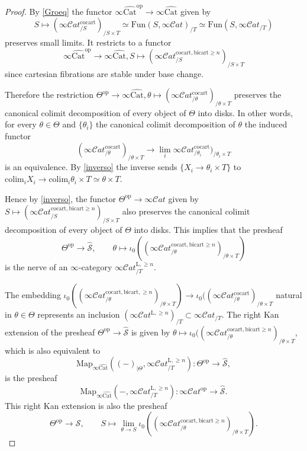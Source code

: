 \documentclass[10pt,oneside]{article}
\numberwithin{equation}{section} %
\numberwithin{figure}{section} %
\theoremstyle{plain}
\theoremstyle{definition}
\newcommand{\mS}{{\mathcal S}}
\newcommand{\op}{\mathrm{op}}
\newcommand{\colim}{\mathrm{colim}}
\newcommand{\Cat}{\mathrm{Cat}}
\newcommand{\Fun}{\mathrm{Fun}}
\newcommand{\cocart}{{\mathrm{cocart}}}
\newcommand{\bicart}{{\mathrm{bicart}}}
\newcommand{\Map}{{\mathrm{Map}}}
\newcommand{\scat}{\mathcal{C}\mathit{at}}
\begin{document}
\begin{proof}
By \cref{Groeq} the functor $ \infty\widehat{\Cat}^\op \to \infty\widehat{\Cat}$ given by $$ S \mapsto (\infty\scat^{\cocart}_{/S})_{/ S \times T} \simeq \Fun(S, \infty\scat)_{/T} \simeq \Fun(S, \infty\scat_{/T}) $$ preserves small limits.
It restricts to a functor $$ \infty\widehat{\Cat}^\op \to \infty\widehat{\Cat}, S \mapsto (\infty\scat^{\cocart, \bicart\geq n}_{/S})_{/ S \times T} $$ since cartesian fibrations are stable under base change.

Therefore the restriction $\Theta^\op \to \infty\widehat{\Cat}, \theta \mapsto (\infty\scat^{\cocart}_{/\theta})_{/ \theta \times T} $ preserves the canonical colimit decomposition of every object of $\Theta$ into disks.
In other words, for every $\theta \in \Theta$ and $\{\theta_i\}$ the canonical colimit decomposition of $\theta$ the induced functor
$$ (\infty\scat^{\cocart}_{/\theta})_{/ \theta \times T} \to \lim_i \infty\scat^{\cocart}_{/\theta_i})_{/ \theta_i \times T} $$
is an equivalence. By \cref{inverso} the inverse sends $\{X_i \to \theta_i \times T\}$
to $\colim_i X_i \to \colim_i \theta_i \times T \simeq \theta \times T.$

Hence by \cref{inverso}, the functor $\Theta^\op \to \infty\scat$ given by $S \mapsto (\infty\scat^{\cocart, \bicart\geq n}_{/S})_{/ S \times T} $ also preserves the canonical colimit decomposition of every object of $\Theta$ into disks.
This implies that the presheaf $$ \Theta^\op \to \widehat{\mS},\qquad \theta \mapsto \iota_0((\infty\scat^{\cocart, \bicart\geq n}_{/\theta})_{/ \theta \times T}) $$
is the nerve of an $\infty$-category 
$\infty\scat_{/T}^{\mathrm{L},\geq n}.$

The embedding
$\iota_0((\infty\scat^{\cocart, \bicart,\geq n}_{/\theta})_{/ \theta \times T}) \to \iota_0((\infty\scat^{\cocart}_{/\theta})_{/ \theta \times T}$ natural in $\theta \in \Theta$
represents an inclusion $(\infty\scat^{\mathrm{L},\geq n})_{/ T} \subset \infty\scat_{/ T}$.
The right Kan extension of the presheaf $\Theta^\op \to \widehat{\mS}$ is given by $ \theta \mapsto \iota_0((\infty\scat^{\cocart, \bicart\geq n}_{/\theta})_{/ \theta \times T} $, which is also equivalent to 
$$ \Map_{\infty\widehat{\Cat}}((-)_{\mid \Theta}, \infty\scat^{\mathrm{L},\geq n}_{/ T}): \Theta^\op \to \widehat{\mS}, $$ is the presheaf
$$\Map_{\infty\widehat{\Cat}}(-, \infty\scat^{\mathrm{L},\geq n}_{/ T}): \infty\scat^\op \to \widehat{\mS}.$$ 
This right Kan extension is also the presheaf $$\Theta^\op \to \widehat{\mS},\qquad S \mapsto \lim_{\theta \to S}\iota_0((\infty\scat^{\cocart, \bicart\geq n}_{/\theta})_{/ \theta \times T}).$$


\end{proof}
\end{document}
